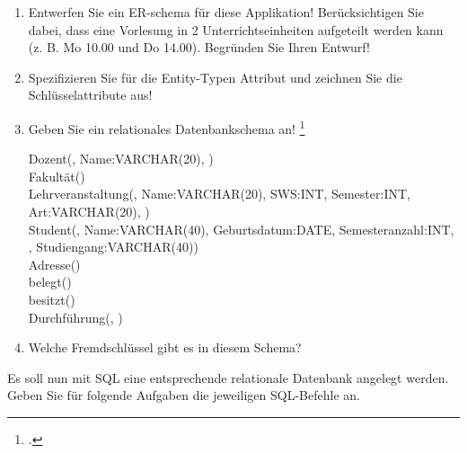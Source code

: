 \documentclass{bschlangaul-aufgabe}
\begin{document}
\begin{enumerate}


\item Entwerfen Sie ein ER-schema für diese Applikation!
Berücksichtigen Sie dabei, dass eine Vorlesung in 2
Unterrichtseinheiten aufgeteilt werden kann (z. B. Mo 10.00 und Do
14.00). Begründen Sie Ihren Entwurf!


\item Spezifizieren Sie für die Entity-Typen Attribut und zeichnen Sie
die Schlüsselattribute aus!


\item Geben Sie ein relationales Datenbankschema an!
\footcite[Uni-ER-Modell, Aufgabe 2]{db:ab:4}

\begin{liAntwort}
\ttfamily
\footnotesize
Dozent(, Name:VARCHAR(20),
)\\

Fakultät()\\

Lehrveranstaltung(, Name:VARCHAR(20), SWS:INT,
Semester:INT, Art:VARCHAR(20), )\\

Student(, Name:VARCHAR(40), Geburtsdatum:DATE,
Semesteranzahl:INT, ,
Studiengang:VARCHAR(40))\\

Adresse()\\

belegt()\\

besitzt()\\

Durchführung(, )\\
\end{liAntwort}

\item Welche Fremdschlüssel gibt es in diesem Schema?
\end{enumerate}

\noindent
Es soll nun mit SQL eine entsprechende relationale Datenbank
angelegt werden. Geben Sie für folgende Aufgaben die jeweiligen
SQL-Befehle an.
\end{document}
